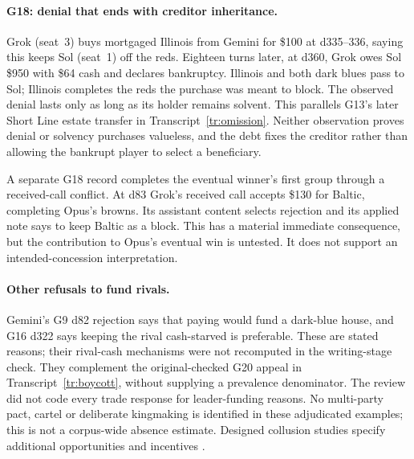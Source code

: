 \paragraph{G18: denial that ends with creditor inheritance.}
Grok (seat~3) buys mortgaged Illinois from Gemini for \$100 at d335--336, saying this keeps Sol (seat~1) off the reds. Eighteen turns later, at d360, Grok owes Sol \$950 with \$64 cash and declares bankruptcy. Illinois and both dark blues pass to Sol; Illinois completes the reds the purchase was meant to block. The observed denial lasts only as long as its holder remains solvent. This parallels G13's later Short Line estate transfer in Transcript~\ref{tr:omission}. Neither observation proves denial or solvency purchases valueless, and the debt fixes the creditor rather than allowing the bankrupt player to select a beneficiary.

A separate G18 record completes the eventual winner's first group through a received-call conflict. At d83 Grok's received call accepts \$130 for Baltic, completing Opus's browns. Its assistant content selects rejection and its applied note says to keep Baltic as a block. This has a material immediate consequence, but the contribution to Opus's eventual win is untested. It does not support an intended-concession interpretation.

\paragraph{Other refusals to fund rivals.}
Gemini's G9 d82 rejection says that paying would fund a dark-blue house, and G16 d322 says keeping the rival cash-starved is preferable. These are stated reasons; their rival-cash mechanisms were not recomputed in the writing-stage check. They complement the original-checked G20 appeal in Transcript~\ref{tr:boycott}, without supplying a prevalence denominator. The review did not code every trade response for leader-funding reasons. No multi-party pact, cartel or deliberate kingmaking is identified in these adjudicated examples; this is not a corpus-wide absence estimate. Designed collusion studies specify additional opportunities and incentives \citep{shi2026emergentcollusion}.
